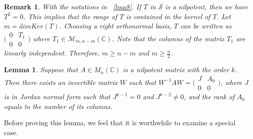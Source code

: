 \documentclass[a4paper,10pt]{amsart}
\newtheorem{lemma}{Lemma}[section]
\newtheorem{remark}{Remark}[section]
\theoremstyle{refs}
\begin{document}
\begin{remark} \label{rem3}
With the notations in ~\cref{lma8}. If $T$ in $\mathcal{S}$
is a nilpotent, then we have $T^{2}=0$. This implies that the range of $T$
is contained in the kernel of
$T$. Let $m = dimKer(T)$. Choosing a right orthonormal basis, $T$ can be
written as
$\bigl(\begin{smallmatrix}
           0 & T_1 \\
           0 & 0
           \end{smallmatrix} \bigr)$ where
$T_{1}\in\mathcal{M}_{m,n-m}(\mathbb{C})$. Note that the
columns of the matrix $T_{1}$ are linearly independent.
Therefore, $m \geq n-m$ and $m \geq {\frac{n}{2}}$.
\end{remark}


\begin{lemma} \label{lma9}
Suppose that $A\in M_{n}(\mathbb{C})$ is a nilpotent matrix with the order $k$.
Then there exists an invertible matrix
$W$ such that
$W^{-1}AW=\bigl(\begin{smallmatrix}
           J & A_{0}\\
           0 & 0\end{smallmatrix} \bigr)$,
where $J$ is in Jordan normal form such that $J^{k-1}=0$
and $J^{k-2}\neq0$, and the rank of $A_0$ equals to the number of
its columns.
\end{lemma}


Before proving this lemma, we feel that it is worthwhile to
examine a special case.
\end{document}
